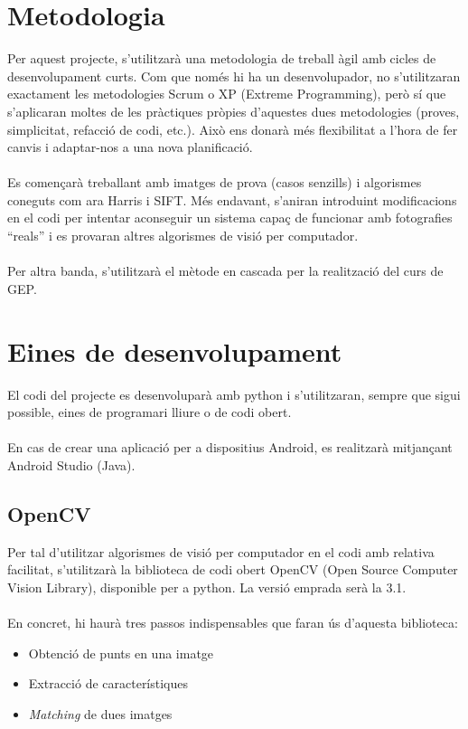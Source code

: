 \section{Metodologia}
	Per aquest projecte, s'utilitzarà una metodologia de treball àgil amb cicles de desenvolupament curts.
	Com que només hi ha un desenvolupador, no s'utilitzaran exactament les metodologies Scrum o XP\cite{Pxp} (Extreme Programming),
	però sí que s'aplicaran moltes de les pràctiques pròpies d'aquestes dues metodologies (proves, simplicitat, refacció de codi, etc.).
	Això ens donarà més flexibilitat a l'hora de fer canvis i adaptar-nos a una nova planificació.\\\\
	Es començarà treballant amb imatges de prova (casos senzills) i algorismes coneguts com ara Harris\cite{Harris} i SIFT. Més endavant, s'aniran introduint modificacions en el codi per intentar aconseguir un
	sistema capaç de funcionar amb fotografies ``reals'' i es provaran altres algorismes de visió per computador.\\\\
	Per altra banda, s'utilitzarà el mètode en cascada per la realització del curs de GEP.
\section{Eines de desenvolupament}
	El codi del projecte es desenvoluparà amb python i s'utilitzaran, sempre que sigui possible, eines de programari lliure o de codi obert.\\\\
	En cas de crear una aplicació per a dispositius Android, es realitzarà mitjançant Android Studio (Java).
	\subsection{OpenCV}
		Per tal d'utilitzar algorismes de visió per computador en el codi amb relativa facilitat, s'utilitzarà la biblioteca de codi obert OpenCV\cite{OpenCV} (Open Source Computer Vision Library),
		disponible per a python. La versió emprada serà la 3.1.\\\\
		En concret, hi haurà tres passos indispensables que faran ús d'aquesta biblioteca:\\
		\begin{itemize}
			\item {Obtenció de punts en una imatge}
			\item {Extracció de característiques}
			\item \textit{Matching} de dues imatges
		\end{itemize}
